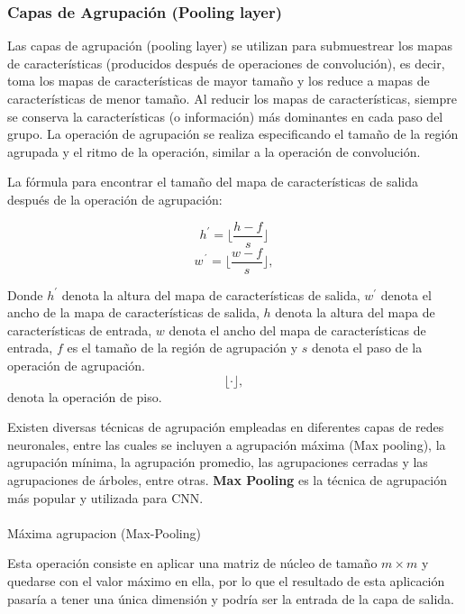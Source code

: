 \documentclass[
  us-letterpaper,
]{scrreprt}
\makeatletter
\let\oldparagraph\paragraph
\renewcommand{\paragraph}{
    \@ifstar
      \xxxParagraphStar
      \xxxParagraphNoStar
  }
\newcommand{\xxxParagraphStar}[1]{\oldparagraph*{#1}\mbox{}}
\newcommand{\xxxParagraphNoStar}[1]{\oldparagraph{#1}\mbox{}}
\theoremstyle{plain}
\theoremstyle{definition}
\theoremstyle{definition}
\theoremstyle{remark}
\makeatother
\begin{document}
\subsubsection{Capas de Agrupación (Pooling layer)}\label{sec-pooling}

Las capas de agrupación (pooling layer) se utilizan para submuestrear
los mapas de características (producidos después de operaciones de
convolución), es decir, toma los mapas de características de mayor
tamaño y los reduce a mapas de características de menor tamaño. Al
reducir los mapas de características, siempre se conserva la
características (o información) más dominantes en cada paso del grupo.
La operación de agrupación se realiza especificando el tamaño de la
región agrupada y el ritmo de la operación, similar a la operación de
convolución.

La fórmula para encontrar el tamaño del mapa de características de
salida después de la operación de agrupación:

\[ h^\prime = \lfloor \dfrac{h-f}{s} \rfloor \]
\[w^´ = \lfloor \dfrac{w-f}{s} \rfloor ,\]

Donde \(h^\prime\) denota la altura del mapa de características de
salida, \(w^\prime\) denota el ancho de la mapa de características de
salida, \(h\) denota la altura del mapa de características de entrada,
\(w\) denota el ancho del mapa de características de entrada, \(f\) es
el tamaño de la región de agrupación y \(s\) denota el paso de la
operación de agrupación. \[ \lfloor \cdot \rfloor ,\] denota la
operación de piso.

Existen diversas técnicas de agrupación empleadas en diferentes capas de
redes neuronales, entre las cuales se incluyen a agrupación máxima (Max
pooling), la agrupación mínima, la agrupación promedio, las agrupaciones
cerradas y las agrupaciones de árboles, entre otras. \textbf{Max
Pooling} es la técnica de agrupación más popular y utilizada para CNN.

\paragraph{Máxima agrupacion
(Max-Pooling)}\label{muxe1xima-agrupacion-max-pooling}

Esta operación consiste en aplicar una matriz de núcleo de tamaño
\(m \times m\) y quedarse con el valor máximo en ella, por lo que el
resultado de esta aplicación pasaría a tener una única dimensión y
podría ser la entrada de la capa de salida.
\end{document}
